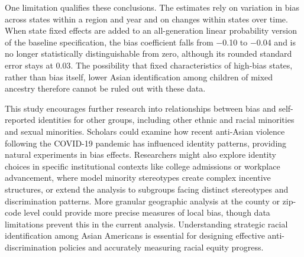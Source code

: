 One limitation qualifies these conclusions. The estimates rely on variation in bias across states within a region and year and on changes within states over time. When state fixed effects are added to an all-generation linear probability version of the baseline specification, the bias coefficient falls from $-$0.10 to $-$0.04 and is no longer statistically distinguishable from zero, although its rounded standard error stays at 0.03. The possibility that fixed characteristics of high-bias states, rather than bias itself, lower Asian identification among children of mixed ancestry therefore cannot be ruled out with these data.
 
This study encourages further research into relationships between bias and self-reported identities for other groups, including other ethnic and racial minorities and sexual minorities. Scholars could examine how recent anti-Asian violence following the COVID-19 pandemic has influenced identity patterns, providing natural experiments in bias effects. Researchers might also explore identity choices in specific institutional contexts like college admissions or workplace advancement, where model minority stereotypes create complex incentive structures, or extend the analysis to subgroups facing distinct stereotypes and discrimination patterns. More granular geographic analysis at the county or zip-code level could provide more precise measures of local bias, though data limitations prevent this in the current analysis. Understanding strategic racial identification among Asian Americans is essential for designing effective anti-discrimination policies and accurately measuring racial equity progress.
